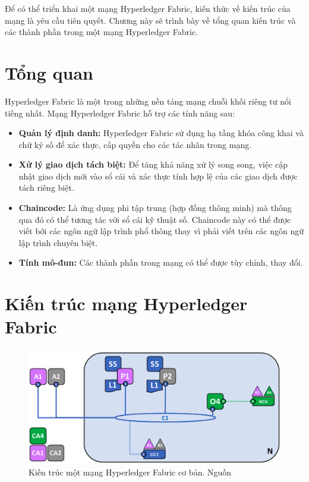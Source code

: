 \documentclass[../DoAn.tex]{subfiles}
\begin{document}
Để có thể triển khai một mạng Hyperledger Fabric, kiến thức về kiến trúc của mạng là yêu cầu tiên quyết. Chương này sẽ trình bày về tổng quan kiến trúc và các thành phần trong một mạng Hyperledger Fabric.

\section{Tổng quan}

Hyperledger Fabric là một trong những nền tảng mạng chuỗi khối riêng tư nổi tiếng nhất. Mạng Hyperledger Fabric hỗ trợ các tính năng sau:
\begin{itemize}
  \item \textbf{Quản lý định danh:} Hyperledger Fabric sử dụng hạ tầng khóa công khai và chữ ký số để xác thực, cấp quyền cho các tác nhân trong mạng.
  \item \textbf{Xử lý giao dịch tách biệt:} Để tăng khả năng xử lý song song, việc cập nhật giao dịch mới vào sổ cái và xác thực tính hợp lệ của các giao dịch được tách riêng biệt.
  \item \textbf{Chaincode:} Là ứng dụng phi tập trung (hợp đồng thông minh) mà thông qua đó có thể tương tác với sổ cái kỹ thuật số. Chaincode này có thể được viết bới các ngôn ngữ lập trình phổ thông thay vì phải viết trên các ngôn ngữ lập trình chuyên biệt.
  \item \textbf{Tính mô-đun:} Các thành phần trong mạng có thể được tùy chỉnh, thay đổi.
\end{itemize}

\section{Kiến trúc mạng Hyperledger Fabric}
\begin{figure}[h]
  \centering
  \includegraphics[width=0.75\linewidth]{Hinhve/network.diagram.7.png}
  \caption[Kiến trúc một mạng Hyperledger Fabric cơ bản]{Kiến trúc một mạng Hyperledger Fabric cơ bản. Nguồn \cite{fabric_architecture}}
  \label{fig:fabric_architecture}
\end{figure}
\end{document}
